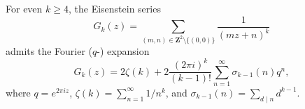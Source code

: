 For even $k \geq 4$, the Eisenstein series
$$
G_k(z) = \sum_{(m,n) \in \mathbf{Z}^2 \setminus \{(0,0)\}} \frac{1}{(mz+n)^k}
$$
admits the Fourier ($q$-) expansion
$$
G_k(z) = 2\zeta(k) + 2\frac{(2\pi i)^k}{(k-1)!} \sum_{n=1}^\infty \sigma_{k-1}(n) q^n,
$$
where $q = e^{2\pi i z}$, $\zeta(k) = \sum_{n=1}^\infty 1/n^k$, and $\sigma_{k-1}(n) = \sum_{d \mid n} d^{k-1}$.
